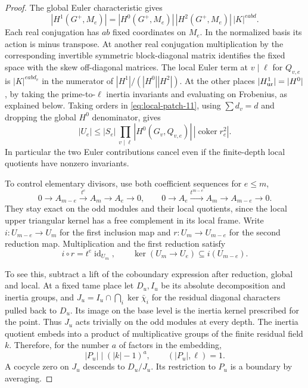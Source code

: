 \begin{proof}
The global Euler characteristic gives
\[
 |H^1(G^+,M_e)|=
    |H^0(G^+,M_e)|\,|H^2(G^+,M_e)|\,|K|^{eabd}.
\]
Each real conjugation has \(ab\) fixed coordinates
on \(M_e\). In the normalized basis its action
is minus transpose. At another real conjugation
multiplication by the corresponding invertible
symmetric block-diagonal matrix identifies the
fixed space with the skew off-diagonal matrices.
The local Euler term at \(v\mid\ell\) for
\(Q_{v,e}\) is \(|K|^{eab d_v}\) in the numerator
of \(|H^1|/(|H^0||H^2|)\). At the other
places \(|H^1_{\rm ur}|=|H^0|\), by taking the prime-to-\(\ell\) inertia invariants
and evaluating on Frobenius, as explained below. Taking orders
in \eqref{eq:local-patch-11}, using \(\sum d_v=d\) and dropping
the global \(H^0\) denominator, gives
\[
 |U_e|\le |S_e|\,
    \prod_{v\mid\ell}|H^0(G_v,Q_{v,e})|\,
                   |\operatorname{coker} r^2_e|.
 \tag{14}\label{eq:local-patch-14}
\]
In particular the two Euler contributions cancel
even if the finite-depth local quotients have
nonzero invariants.

To control elementary divisors, use both coefficient
sequences for \(e\le m\),
\[
 0\to A_{m-e}\xrightarrow{t^e} A_m\to A_e\to0,
 \qquad
 0\to A_e\xrightarrow{t^{m-e}} A_m\to A_{m-e}\to0.
\]
They stay exact on the odd modules and their local
quotients, since the local upper triangular kernel
has a free complement in its local frame. Write
\(i:U_{m-e}\to U_m\) for the first inclusion map
and \(r:U_m\to U_{m-e}\) for the second reduction
map. Multiplication and the first reduction satisfy 
\[
 i\circ r=t^e\operatorname{id}_{U_m},\qquad \ker(U_m\longrightarrow U_e)\subseteq i(U_{m-e}).
\]


To see this, subtract a lift of the coboundary
expression after reduction, global and local.
At a fixed tame place let \(D_u,I_u\) be its absolute
decomposition and inertia groups, and
\(J_u=I_u\cap\bigcap_i\ker\bar\chi_i\) for the residual diagonal
characters pulled back to \(D_u\). Its image on the base level is the
inertia kernel prescribed for the point. Thus \(J_u\) acts trivially on
the odd modules at every depth. The inertia quotient embeds into a product of multiplicative groups of the finite residual field \(k\). Therefore, for the number \(a\) of factors in the embedding,
\[
 |P_u|\mid (|k|-1)^a,\qquad (|P_u|,\ell)=1 .
\] A cocycle zero on \(J_u\) descends to
\(D_u/J_u\). Its restriction to \(P_u\) is a boundary by averaging.


\end{proof}
